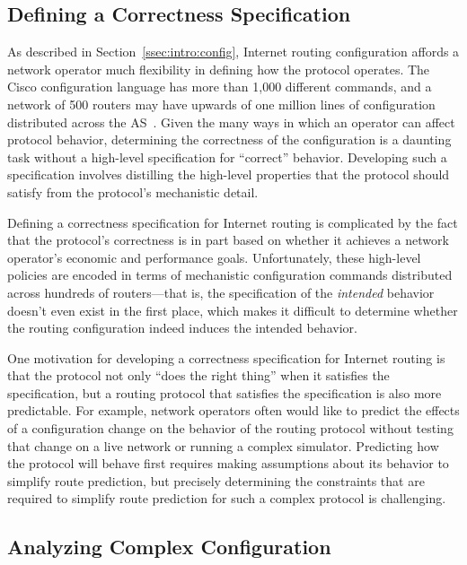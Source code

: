 \subsection{Defining a Correctness Specification}

As described in Section~\ref{ssec:intro:config}, Internet routing
configuration affords a network operator much flexibility in defining
how the protocol operates.  The Cisco configuration language has more
than 1,000 different commands, and a network of 500 routers may have
upwards of one million lines of configuration distributed across the
AS~\cite{www-cisco-ios-master}.  Given the many ways in which an
operator can affect protocol behavior, determining the correctness of
the configuration is a daunting task without a high-level specification
for ``correct'' behavior.  Developing such a specification involves
distilling the high-level properties that the protocol should satisfy
from the protocol's mechanistic detail.

Defining a correctness specification for Internet routing is complicated
by the fact that the protocol's correctness is in part 
based on whether it achieves a network operator's economic
and performance goals.  Unfortunately, these high-level policies are
encoded in terms of mechanistic configuration commands distributed
across hundreds of routers---that is, the specification of the {\em
intended} behavior doesn't even exist in the first place, which makes it
difficult to determine whether the routing configuration indeed induces
the intended behavior.

One motivation for developing a correctness specification for Internet
routing is that the protocol not only ``does the right thing'' when it
satisfies the specification, but a routing protocol that satisfies the
specification is also more predictable.  For example, network operators
often would like to predict the effects of a configuration change on the
behavior of the routing protocol without testing that change on a live
network or running a complex simulator.  Predicting how the protocol
will behave first requires making assumptions about its behavior to
simplify route prediction, but precisely determining the constraints that
are required to simplify route prediction for such a complex protocol is
challenging.

\subsection{Analyzing Complex Configuration}

